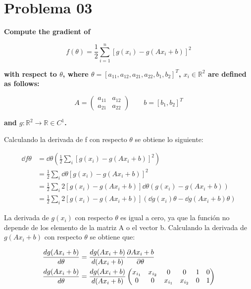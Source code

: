 \section*{Problema 03}

\textbf{Compute the gradient of}

\begin{equation*}
    f(\theta) = \frac{1}{2} \sum_{i=1}^n [g(x_i)-g(Ax_i+b)]^2
\end{equation*}

\textbf{with respect to $\theta$, where $\theta=[a_{11},a_{12},a_{21},a_{22},b_1,b_2]^T$, $x_i \in \mathbb{R}^2$ are defined as follows:}

\begin{equation*}
    A = \begin{pmatrix}
        a_{11} & a_{12} \\
        a_{21} & a_{22}
    \end{pmatrix} \qquad
    b= [b_1,b_2]^T
\end{equation*}

\textbf{and $g: \mathbb{R}^2 \rightarrow \mathbb{R} \in C^1$.}

Calculando la derivada de f con respecto $\theta$ se obtiene lo siguiente:

\begin{align*}
    \dd{f}{\theta} & = \dd{}{\theta}\left ( \frac{1}{2} \sum_i \left [ g(x_i)-g(Ax_i+b)\right ]^2\right )                                 \\
                   & = \frac{1}{2} \sum_i \dd{}{\theta} \left [ g(x_i)-g(Ax_i+b)\right ]^2                                                \\
                   & = \frac{1}{2} \sum_i 2 \left [ g(x_i)-g(Ax_i+b)\right ] \dd{}{\theta} \left ( g(x_i)-g(Ax_i+b) \right )              \\
                   & = \frac{1}{2} \sum_i 2 \left [ g(x_i)-g(Ax_i+b)\right ] \left ( \dd{g(x_i)}{\theta} - \dd{g(Ax_i+b)}{\theta}\right )
\end{align*}

La derivada de $g(x_i)$ con respecto $\theta$ es igual a cero, ya que la función no depende de los elemento de la matriz A o el vector b. Calculando la derivada de $g(Ax_i+b)$ con respecto $\theta$ se obtiene que:

\begin{align*}
    \frac{d g(Ax_i+b)}{d \theta} & = \frac{d g(Ax_i+b)}{d (Ax_i+b)} \frac{\partial Ax_i+b}{\partial \theta} \\
    \frac{d g(Ax_i+b)}{d \theta} & = \frac{d g(Ax_i+b)}{d (Ax_i+b)} \begin{pmatrix}
        x_{i_1} & x_{i_2} & 0       & 0       & 1 & 0 \\
        0       & 0       & x_{i_1} & x_{i_2} & 0 & 1
    \end{pmatrix}
\end{align*}

